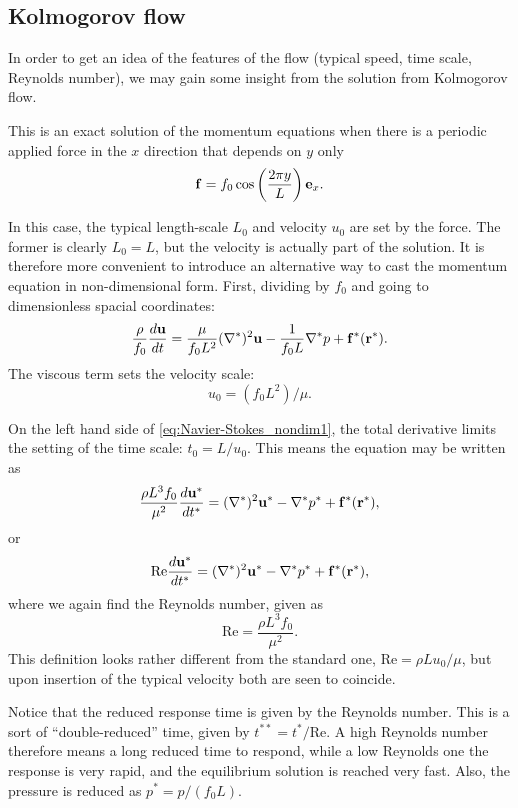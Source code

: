 \subsection{Kolmogorov flow}

In order to get an idea of the features of the flow (typical speed,
time scale, Reynolds number), we may gain some insight from the
solution from Kolmogorov flow.

This is an exact solution of the momentum equations when there is a
periodic applied force in the $x$ direction that depends on $y$ only
\[
\mathbf{f} = f_0 \cos\left( \frac{2\pi y}{L} \right) \mathbf{e}_x .
\]

In this case, the typical length-scale $L_0$ and velocity $u_0$ are
set by the force. The former is clearly $L_0=L$, but the velocity is
actually part of the solution. It is therefore more convenient to
introduce an alternative way to cast the momentum equation in
non-dimensional form. First, dividing by $f_0$ and going to
dimensionless spacial coordinates:
\begin{equation}
\label{eq:Navier-Stokes_nondim1}
\frac{\rho}{f_0}
\frac{d \mathbf{u}}{d t} =
\frac\mu{f_0 L^2} (\nabla^*)^2 \mathbf{u}
-\frac 1{f_0 L} \nabla^* p + \mathbf{f}^*(\mathbf{r}^*) .
\end{equation}
The viscous term sets the velocity scale:
\begin{equation}
  \label{eq:reduced_u0}
  u_0 = ( f_0 L^2 ) / \mu .
\end{equation}

On the left hand side of \ref{eq:Navier-Stokes_nondim1}, the total
derivative limits the setting of the time scale: $t_0=L/u_0$. This
means the equation may be written as
\[
\frac{\rho L^3 f_0}{\mu^2}
\frac{d \mathbf{u}^*}{d t^*} =
(\nabla^*)^2 \mathbf{u}^*
-\nabla^* p^* + \mathbf{f}^*(\mathbf{r}^*) ,
\]
or
\begin{equation}
\label{eq:Navier-Stokes_nondim2}
\mathrm{Re}
\frac{d \mathbf{u}^*}{d t^*} =
(\nabla^*)^2 \mathbf{u}^*
-\nabla^* p^* + \mathbf{f}^*(\mathbf{r}^*) ,
\end{equation}
where we again find the Reynolds number, given as
\[
  \mathrm{Re}=\frac{\rho L^3 f_0 }{\mu^2}.
\]
This definition looks rather different from the standard one,
$ \mathrm{Re}=\rho L u_0 / \mu$, but upon insertion of
the typical velocity both are seen to coincide.

Notice that the reduced response time is given by the Reynolds number.
This is a sort of ``double-reduced'' time, given by
$t^{**}= t^* / \mathrm{Re}$. A high Reynolds number therefore means a
long reduced time to respond, while a low Reynolds one the response is
very rapid, and the equilibrium solution is reached very fast. Also,
the pressure is reduced as $p^*= p / ( f_0 L ) $.

